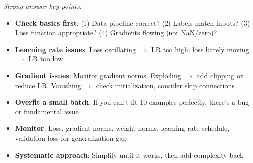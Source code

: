 \documentclass[../../main.tex]{subfiles}
\begin{document}
\begin{interviewquestions}
\textit{Strong answer key points:}
\begin{itemize}
    \item \textbf{Check basics first}: (1) Data pipeline correct? (2) Labels match inputs? (3) Loss function appropriate? (4) Gradients flowing (not NaN/zero)?
    \item \textbf{Learning rate issues}: Loss oscillating $\Rightarrow$ LR too high; loss barely moving $\Rightarrow$ LR too low
    \item \textbf{Gradient issues}: Monitor gradient norms. Exploding $\Rightarrow$ add clipping or reduce LR. Vanishing $\Rightarrow$ check initialization, consider skip connections
    \item \textbf{Overfit a small batch}: If you can't fit 10 examples perfectly, there's a bug or fundamental issue
    \item \textbf{Monitor}: Loss, gradient norms, weight norms, learning rate schedule, validation loss for generalization gap
    \item \textbf{Systematic approach}: Simplify until it works, then add complexity back
\end{itemize}

\end{interviewquestions}
\end{document}
